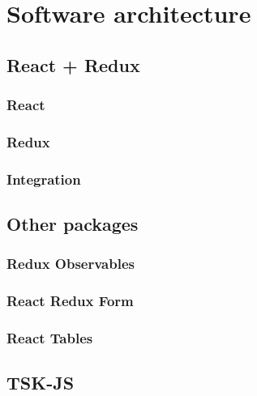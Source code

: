 \chapter{Software architecture}


\section{React + Redux}

\subsection{React}

\subsection{Redux}

\subsection{Integration}

\section{Other packages}

\subsection{Redux Observables}

\subsection{React Redux Form}

\subsection{React Tables}

\section{TSK-JS}

